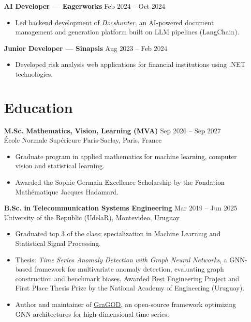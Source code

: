 \documentclass[10pt, letterpaper]{article}
\newenvironment{highlights}{
\begin{itemize}[topsep=0.06cm,itemsep=0pt,parsep=0pt,leftmargin=0.5cm]
}{
\end{itemize}
}
\begin{document}
\vspace{0.10cm}

\textbf{AI Developer — Eagerworks} \hfill Feb 2024 -- Oct 2024
\begin{highlights}
\item Led backend development of \textit{Docshunter}, an AI-powered document management and generation platform built on LLM pipelines (LangChain).
\end{highlights}

\vspace{0.10cm}

\textbf{Junior Developer — Sinapsis} \hfill Aug 2023 -- Feb 2024
\begin{highlights}
\item Developed risk analysis web applications for financial institutions using .NET technologies.
\end{highlights}

\section{Education}

\textbf{M.Sc. Mathematics, Vision, Learning (MVA)} \hfill Sep 2026 -- Sep 2027 \\
École Normale Supérieure Paris-Saclay, Paris, France

\begin{highlights}
\item Graduate program in applied mathematics for machine learning, computer vision and statistical learning.
\item Awarded the Sophie Germain Excellence Scholarship by the Fondation Mathématique Jacques Hadamard.
\end{highlights}

\vspace{0.10cm}

\textbf{B.Sc. in Telecommunication Systems Engineering} \hfill Mar 2019 -- Jun 2025 \\
University of the Republic (UdelaR), Montevideo, Uruguay

\begin{highlights}
\item Graduated top 3 of the class; specialization in Machine Learning and Statistical Signal Processing.
\item Thesis: \textit{Time Series Anomaly Detection with Graph Neural Networks}, a GNN-based framework for multivariate anomaly detection, evaluating graph construction and benchmark biases. Awarded Best Engineering Project and First Place Thesis Prize by the National Academy of Engineering (Uruguay).
\item Author and maintainer of \href{https://github.com/GraGODs/GraGOD}{GraGOD}, an open-source framework optimizing GNN architectures for high-dimensional time series.
\end{highlights}
\end{document}
